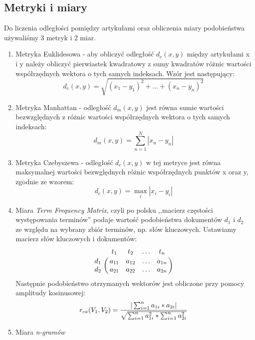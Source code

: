 \documentclass{classrep}
\let\bbordermatrix\bordermatrix
\begin{document}
\subsection{Metryki i miary}
Do liczenia odległości pomiędzy artykułami oraz obliczenia miary podobieństwa używaliśmy 3 metryk i 2 miar.
\begin{enumerate}
\item Metryka Euklidesowa - aby obliczyć odległość $d_e(x,y)$ między artykułami x i y należy obliczyć pierwiastek kwadratowy z sumy kwadratów różnic wartości współrzędnych wektora o tych samych indeksach. Wzór jest następujący:
\begin{equation} 
d_e(x,y)=\sqrt{(x_1-y_1)^2+\ldots+(x_n-y_n)^2}
\end{equation}
\item Metryka Manhattan - odległość $d_m(x,y)$ jest równa sumie wartości bezwzględnych z różnic wartości współrzędnych wektora o tych samych indeksach:
\begin{equation} 
d_m(x,y)=\sum_{n=1}^{N} |{x_n-y_n}|
\end{equation}
\item Metryka Czebyszewa - odległość $d_c(x,y)$ w tej metryce jest równa maksymalnej wartości bezwględnych różnic współrzędnych punktów x oraz y, zgodnie ze wzorem:
\begin{equation} 
d_c(x,y)=\max_{i} |{x_i-y_i}|
\end{equation}
\item Miara \textsl{Term Frequency Matrix}, czyli po polsku ,,macierz częstości występowania terminów'' podaje wartość podobieństwa dokumentów $d_1$ i $d_2$ ze względu na wybrany zbiór terminów, np. słów kluczowych. Ustawiamy macierz słów kluczowych i dokumentów:
\begin{equation}
\bbordermatrix{~ & t_1 & t_2 & \ldots & t_n \cr
                  d_1 & a_{11} & a_{12} & \ldots & a_{1n} \cr
                  d_2 & a_{21} & a_{22} & \ldots & a_{2n} \cr}
\end{equation}
Następnie podobieństwo otrzymanych wektorów jest obliczone przy pomocy amplitudy kosinusowej: 
\begin{equation}
r_{ca}(V_1, V_2)= \textsl{$\frac{|\sum_{i=1}^{n} a_{1i}*a_{2i}|}{\sqrt{\sum_{i=1}^{n} a_{1i}^2 * \sum_{i=1}^{n} a_{2i}^2}}$}
\end{equation}
\item Miara \textsl{n-gramów} 


\end{enumerate}
\end{document}
